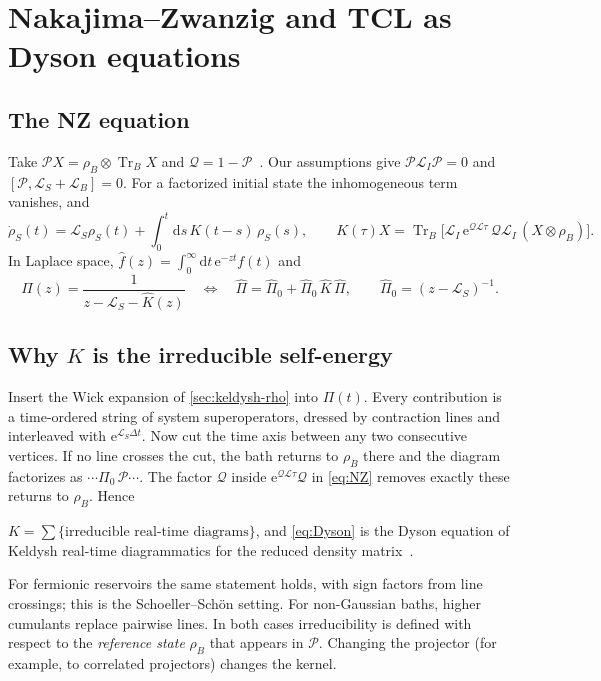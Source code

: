 \documentclass[11pt]{article}
\newcommand{\Tr}{\operatorname{Tr}}
\newcommand{\Lc}{\mathcal{L}}
\newcommand{\Pc}{\mathcal{P}}
\newcommand{\Qc}{\mathcal{Q}}
\newcommand{\ee}{\mathrm{e}}
\newcommand{\dd}{\mathrm{d}}
\newcommand{\rhoB}{\rho_{B}}
\begin{document}
\section{Nakajima--Zwanzig and TCL as Dyson equations}
\label{sec:nz}

\subsection{The NZ equation}
Take $\Pc X=\rhoB\otimes\Tr_B X$ and $\Qc=1-\Pc$~\cite{Nakajima1958,Zwanzig1960,BreuerPetruccione}.
Our assumptions give $\Pc\Lc_I\Pc=0$ and $[\Pc,\Lc_S+\Lc_B]=0$. For a factorized initial
state the inhomogeneous term vanishes, and
\begin{equation}
  \dot\rho_S(t)=\Lc_S\rho_S(t)+\int_0^t\!\dd s\,K(t-s)\,\rho_S(s),\qquad
  K(\tau)X=\Tr_B\!\big[\Lc_I\,\ee^{\Qc\Lc\tau}\,\Qc\Lc_I\,(X\otimes\rhoB)\big].
  \label{eq:NZ}
\end{equation}
In Laplace space, $\hat f(z)=\int_0^\infty\dd t\,\ee^{-zt}f(t)$ and
\begin{equation}
  \boxed{\;\hat\Pi(z)=\frac{1}{z-\Lc_S-\hat K(z)}
  \quad\Longleftrightarrow\quad
  \hat\Pi=\hat\Pi_0+\hat\Pi_0\,\hat K\,\hat\Pi,\qquad \hat\Pi_0=(z-\Lc_S)^{-1}.\;}
  \label{eq:Dyson}
\end{equation}

\subsection{Why \texorpdfstring{$K$}{K} is the irreducible self-energy}
Insert the Wick expansion of \cref{sec:keldysh-rho} into $\Pi(t)$. Every contribution is a
time-ordered string of system superoperators, dressed by contraction lines and
interleaved with $\ee^{\Lc_S\Delta t}$. Now cut the time axis between any two
consecutive vertices. If no line crosses the cut, the bath returns to $\rhoB$ there
and the diagram factorizes as $\cdots\Pi_0\,\Pc\cdots$. The factor $\Qc$ inside
$\ee^{\Qc\Lc\tau}\Qc$ in \cref{eq:NZ} removes exactly these returns to $\rhoB$. Hence
\begin{keybox}[Identity]
$K=\sum\{\text{irreducible real-time diagrams}\}$, and \cref{eq:Dyson} is the Dyson
equation of Keldysh real-time diagrammatics for the reduced density
matrix~\cite{SchoellerSchon1994,Konig1996,Schoeller2009,LeijnseWegewijs2008,Timm2008}.
\end{keybox}
For fermionic reservoirs the same statement holds, with sign factors from line
crossings; this is the Schoeller--Sch\"on setting. For non-Gaussian baths, higher
cumulants replace pairwise lines. In both cases irreducibility is defined with respect
to the \emph{reference state} $\rhoB$ that appears in $\Pc$. Changing the projector (for
example, to correlated projectors) changes the kernel.
\end{document}
